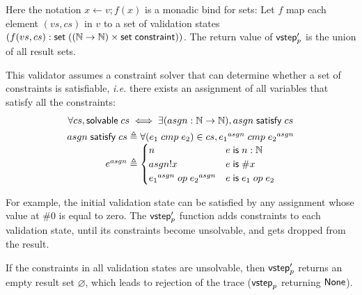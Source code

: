 Here the notation $x\gets v; f(x)$ is a monadic bind for sets: Let $f$ map each
element $(vs,cs)$ in $v$ to a set of validation states
$(f(vs,cs):\mathsf{set}\;((\mathbb N\to\mathbb N)\times\mathsf{set}\;\mathsf{constraint}))$.  The return value of
$\mathsf{vstep}_p'$ is the union of all result sets.

This validator assumes a constraint solver that can determine whether a set of
constraints is satisfiable, {\it i.e.} there exists an assignment of all
variables that satisfy all the constraints:
\begin{gather*}
  \forall cs,\solvable cs\iff\exists (asgn:\Nat\to\Nat),\satisfy{asgn}cs\\
  \begin{array}{r@{\;}l}
    \satisfy{asgn}cs\triangleq&\forall(e_1\;cmp\;e_2)\in cs, {e_1}^{asgn}\;cmp\;{e_2}^{asgn}\\
    e^{asgn}\triangleq&\begin{cases}
      n&e\Is n:\Nat\\
      asgn!x&e\Is \#x\\
      {e_1}^{asgn}\;op\;{e_2}^{asgn}&e\Is e_1\;op\;e_2
    \end{cases}
  \end{array}
\end{gather*}

For example, the initial validation state can be satisfied by any assignment
whose value at $\#0$ is equal to zero.  The $\mathsf{vstep}_p'$ function adds constraints
to each validation state, until its constraints become unsolvable, and gets
dropped from the result.

If the constraints in all validation states are unsolvable, then $\mathsf{vstep}_p'$
returns an empty result set $\varnothing$, which leads to rejection of the trace
($\mathsf{vstep}_p$ returning $\mathsf{None}$).
